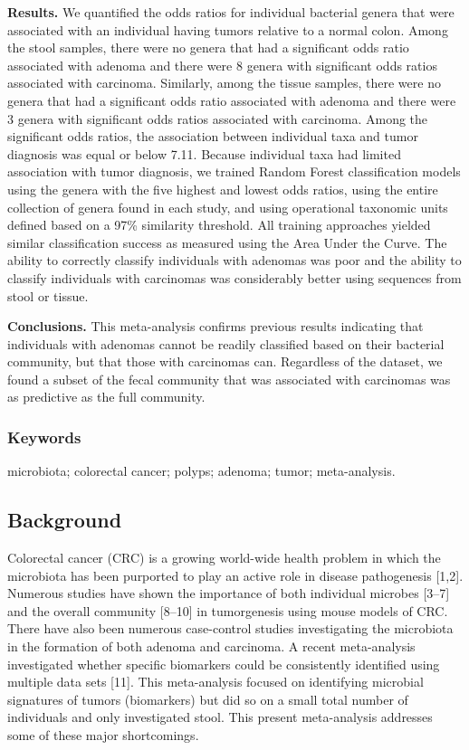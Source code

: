 \documentclass[12pt,]{article}
\begin{document}
\textbf{Results.} We quantified the odds ratios for individual bacterial
genera that were associated with an individual having tumors relative to
a normal colon. Among the stool samples, there were no genera that had a
significant odds ratio associated with adenoma and there were 8 genera
with significant odds ratios associated with carcinoma. Similarly, among
the tissue samples, there were no genera that had a significant odds
ratio associated with adenoma and there were 3 genera with significant
odds ratios associated with carcinoma. Among the significant odds
ratios, the association between individual taxa and tumor diagnosis was
equal or below 7.11. Because individual taxa had limited association
with tumor diagnosis, we trained Random Forest classification models
using the genera with the five highest and lowest odds ratios, using the
entire collection of genera found in each study, and using operational
taxonomic units defined based on a 97\% similarity threshold. All
training approaches yielded similar classification success as measured
using the Area Under the Curve. The ability to correctly classify
individuals with adenomas was poor and the ability to classify
individuals with carcinomas was considerably better using sequences from
stool or tissue.

\textbf{Conclusions.} This meta-analysis confirms previous results
indicating that individuals with adenomas cannot be readily classified
based on their bacterial community, but that those with carcinomas can.
Regardless of the dataset, we found a subset of the fecal community that
was associated with carcinomas was as predictive as the full community.

\subsubsection{Keywords}\label{keywords}

microbiota; colorectal cancer; polyps; adenoma; tumor; meta-analysis.

\newpage

\subsection{Background}\label{background}

Colorectal cancer (CRC) is a growing world-wide health problem in which
the microbiota has been purported to play an active role in disease
pathogenesis {[}1,2{]}. Numerous studies have shown the importance of
both individual microbes {[}3--7{]} and the overall community
{[}8--10{]} in tumorgenesis using mouse models of CRC. There have also
been numerous case-control studies investigating the microbiota in the
formation of both adenoma and carcinoma. A recent meta-analysis
investigated whether specific biomarkers could be consistently
identified using multiple data sets {[}11{]}. This meta-analysis focused
on identifying microbial signatures of tumors (biomarkers) but did so on
a small total number of individuals and only investigated stool. This
present meta-analysis addresses some of these major shortcomings.
\end{document}
